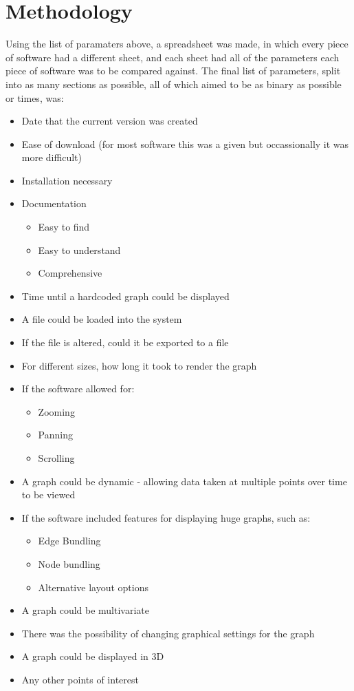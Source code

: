 \documentclass{l4proj}
\begin{document}
\section{Methodology}
Using the list of paramaters above, a spreadsheet was made, in which every piece of software had a different sheet, and each sheet had all of the parameters each piece of software was to be compared against. The final list of parameters, split into as many sections as possible, all of which aimed to be as binary as possible or times, was:
\begin{itemize}
	\item Date that the current version was created
	\item Ease of download (for most software this was a given but occassionally it was more difficult)
	\item Installation necessary
	\item Documentation
	\begin{itemize}
		\item Easy to find
		\item Easy to understand
		\item Comprehensive
	\end{itemize}
	\item Time until a hardcoded graph could be displayed
	\item A file could be loaded into the system
	\item If the file is altered, could it be exported to a file
	\item For different sizes, how long it took to render the graph
	\item If the software allowed for:
	\begin{itemize}
		\item Zooming
		\item Panning
		\item Scrolling
	\end{itemize}
	\item A graph could be dynamic - allowing data taken at multiple points over time to be viewed
	\item If the software included features for displaying huge graphs, such as:
	\begin{itemize}
		\item Edge Bundling
		\item Node bundling
		\item Alternative layout options
	\end{itemize}
	\item A graph could be multivariate
	\item There was the possibility of changing graphical settings for the graph
	\item A graph could be displayed in 3D
	\item Any other points of interest
\end{itemize}
\end{document}
